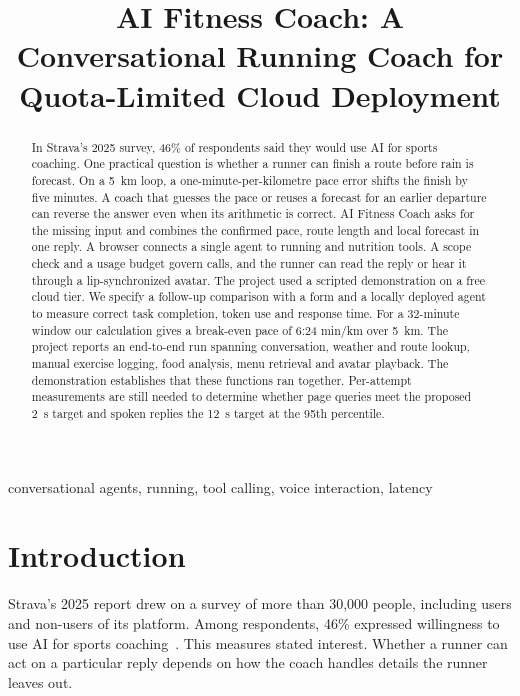 \documentclass[conference]{IEEEtran}
\begin{document}
\title{AI Fitness Coach: A Conversational Running Coach for Quota-Limited Cloud Deployment}
\author{}
\maketitle
\begin{abstract}
In Strava's 2025 survey, 46\% of respondents said they would use AI for sports coaching. One practical question is whether a runner can finish a route before rain is forecast.
On a 5~km loop, a one-minute-per-kilometre pace error shifts the finish by five minutes. A coach that guesses the pace or reuses a forecast for an earlier departure can reverse the answer even when its arithmetic is correct.
AI Fitness Coach asks for the missing input and combines the confirmed pace, route length and local forecast in one reply.
A browser connects a single agent to running and nutrition tools. A scope check and a usage budget govern calls, and the runner can read the reply or hear it through a lip-synchronized avatar.
The project used a scripted demonstration on a free cloud tier. We specify a follow-up comparison with a form and a locally deployed agent to measure correct task completion, token use and response time.
For a 32-minute window our calculation gives a break-even pace of 6:24 min/km over 5~km. The project reports an end-to-end run spanning conversation, weather and route lookup, manual exercise logging, food analysis, menu retrieval and avatar playback. The demonstration establishes that these functions ran together. Per-attempt measurements are still needed to determine whether page queries meet the proposed 2~s target and spoken replies the 12~s target at the 95th percentile.
\end{abstract}
\begin{IEEEkeywords}
conversational agents, running, tool calling, voice interaction, latency
\end{IEEEkeywords}
\section{Introduction}
Strava's 2025 report drew on a survey of more than 30,000 people, including users and non-users of its platform. Among respondents, 46\% expressed willingness to use AI for sports coaching~\cite{strava}. This measures stated interest. Whether a runner can act on a particular reply depends on how the coach handles details the runner leaves out.
\end{document}
